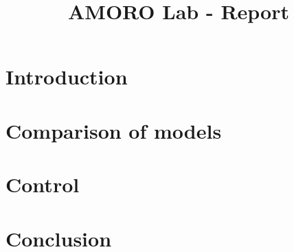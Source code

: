 \documentclass[a4paper]{article}
\title{AMORO Lab - Report}
\author{} %
\date{} %
\begin{document}
\maketitle

\section{Introduction}

\section{Comparison of models}

\section{Control}

\section{Conclusion}
\end{document}

